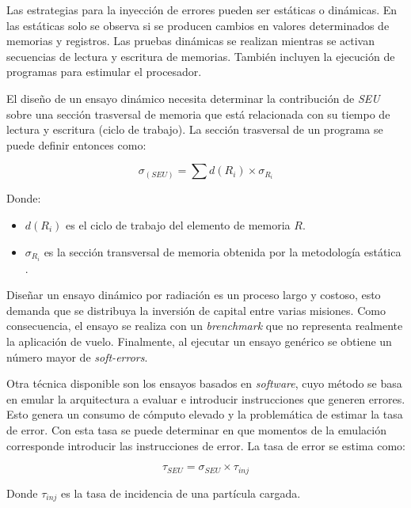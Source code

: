 
Las estrategias para la inyección de errores pueden ser estáticas o dinámicas.
En las estáticas solo se observa si se producen cambios en valores determinados de memorias y registros.
Las pruebas dinámicas se realizan mientras se activan secuencias de lectura y escritura de memorias.
También incluyen la ejecución de programas para estimular el procesador.

El diseño de un ensayo dinámico necesita determinar la contribución de \emph{SEU} sobre una sección trasversal de memoria que está relacionada con su tiempo de lectura y escritura (ciclo de trabajo).
La sección trasversal de un programa se puede definir entonces como:

\begin{equation}
	\label{eq:crosssection}
    \sigma_{(SEU)} = \sum{d(R_i) \times \sigma_{R_i}}
\end{equation}

Donde:
\begin{itemize}
    \item $ d(R_i) $ es el ciclo de trabajo del elemento de memoria $ R $.
    \item $ \sigma_{R_i} $ es la sección transversal de memoria obtenida por la metodología estática \citep{ARTICLE:velazco}.
\end{itemize}

Diseñar un ensayo dinámico por radiación es un proceso largo y costoso, esto demanda que se distribuya la inversión de capital entre varias misiones.
Como consecuencia, el ensayo se realiza con un \emph{brenchmark} que no representa realmente la aplicación de vuelo.
Finalmente, al ejecutar un ensayo genérico se obtiene un número mayor de \emph{soft-errors}.

Otra técnica disponible son los ensayos basados en \emph{software}, cuyo método se basa en emular la arquitectura a evaluar e introducir instrucciones que generen errores.
Esto genera un consumo de cómputo elevado y la problemática de estimar la tasa de error.
Con esta tasa se puede determinar en que momentos de la emulación corresponde introducir las instrucciones de error.
La tasa de error se estima como:

\begin{equation}
	\label{eq:errorrate}
    \tau_{SEU} = \sigma_{SEU} \times \tau_{inj}
\end{equation}

Donde $ \tau_{inj} $ es la tasa de incidencia de una partícula cargada.

